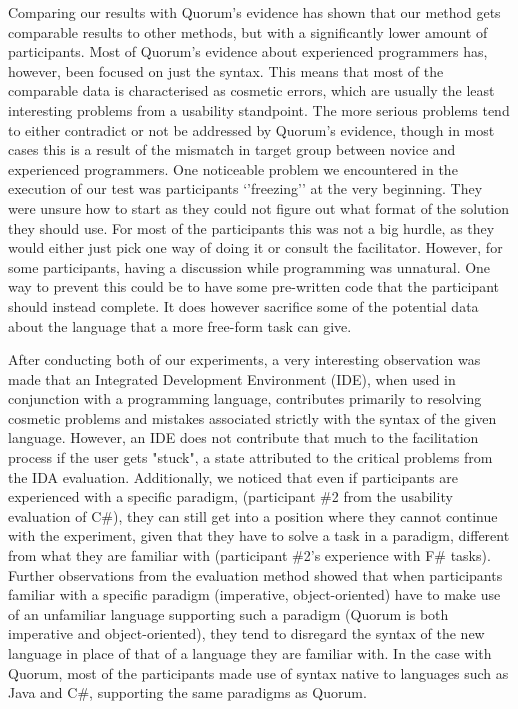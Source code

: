 \documentclass[preprint,10pt]{sigplanconf}
\begin{document}
Comparing our results with Quorum's evidence has shown that our method gets comparable results to other methods, but with a significantly lower amount of participants.
Most of Quorum's evidence about experienced programmers has, however, been focused on just the syntax.
This means that most of the comparable data is characterised as cosmetic errors, which are usually the least interesting problems from a usability standpoint.
The more serious problems tend to either contradict or not be addressed by Quorum's evidence, though in most cases this is a result of the mismatch in target group between novice and experienced programmers.
One noticeable problem we encountered in the execution of our test was participants `'freezing'' at the very beginning.
They were unsure how to start as they could not figure out what format of the solution they should use.
For most of the participants this was not a big hurdle, as they would either just pick one way of doing it or consult the facilitator.
However, for some participants, having a discussion while programming was unnatural.
One way to prevent this could be to have some pre-written code that the participant should instead complete.
It does however sacrifice some of the potential data about the language that a more free-form task can give.

After conducting both of our experiments, a very interesting observation was made that an Integrated Development Environment (IDE), when used in conjunction with a programming language, contributes primarily to resolving cosmetic problems and mistakes associated strictly with the syntax of the given language. However, an IDE does not contribute that much to the facilitation process if the user gets "stuck", a state attributed to the critical problems from the IDA evaluation. Additionally, we noticed that even if participants are experienced with a specific paradigm, (participant \#2 from the usability evaluation of C\#), 
they can still get into a position where they cannot continue with the experiment, given that they have to solve a task in a paradigm, different from what they are familiar with (participant \#2's experience with F\# tasks). Further observations from the evaluation method showed that when participants familiar with a specific paradigm (imperative, object-oriented) have to make use of an unfamiliar language supporting such a paradigm (Quorum is both imperative and object-oriented), they tend to disregard the syntax of the new language in place of that of a language they are familiar with. In the case with Quorum, most of the participants %
made use of syntax native to languages such as Java and C\#, supporting the same paradigms as Quorum.
\end{document}
